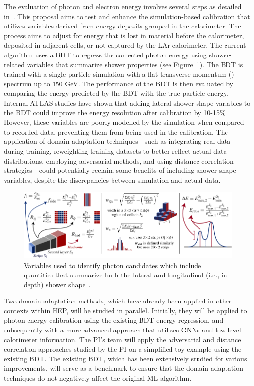 \documentclass[letter, USenglish, 11pt, subfigure]{article}
\begin{document}
The evaluation of photon and electron energy involves several steps as detailed in~\cite{atlascollaboration2023electron}. This proposal aims to test and enhance the simulation-based calibration that utilizes variables derived from energy deposits grouped in the calorimeter. The process aims to adjust for energy that is lost in material before the calorimeter, deposited in adjacent cells, or not captured by the LAr calorimeter. The current algorithm uses a BDT to regress the corrected photon energy using shower-related variables that summarize shower properties (see Figure~\ref{fig:showerVars}). The BDT is trained with a single particle simulation with a flat transverse momentum (\pt) spectrum up to 150 GeV. The performance of the BDT is then evaluated by comparing the energy predicted by the BDT with the true particle energy. Internal ATLAS studies have shown that adding lateral shower shape variables to the BDT could improve the energy resolution after calibration by 10-15\%. However, these variables are poorly modelled by the simulation when compared to recorded data, preventing them from being used in the calibration. The application of domain-adaptation techniques—such as integrating real data during training, reweighting training datasets to better reflect actual data distributions, employing adversarial methods, and using distance correlation strategies—could potentially reclaim some benefits of including shower shape variables, despite the discrepancies between simulation and actual data.

\begin{figure}[ht]
  \centering
  \includegraphics[width=\textwidth]{figures/photon_ID_variables.pdf}
  \caption{\label{fig:showerVars} Variables used to identify photon candidates which include quantities that summarize both the lateral and longitudinal (i.e., in depth) shower shape~\cite{atlascollaboration2023electron}. }
\end{figure}

Two domain-adaptation methods, which have already been applied in other contexts within HEP, will be studied in parallel. Initially, they will be applied to photon-energy calibration using the existing BDT energy regression, and subsequently with a more advanced approach that utilizes GNNs and low-level calorimeter information. The PI's team will apply the adversarial and distance correlation approaches studied by the PI on a simplified toy example using the existing BDT. The existing BDT, which has been extensively studied for various improvements, will serve as a benchmark to ensure that the domain-adaptation techniques do not negatively affect the original ML algorithm.
\end{document}
